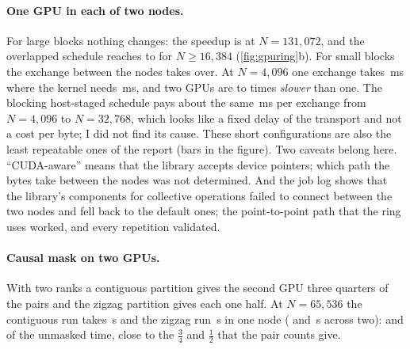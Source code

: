 \paragraph{One GPU in each of two nodes.} For large blocks nothing changes: the
speedup is  at $N=131{,}072$, and the overlapped
schedule reaches  to  for
$N\ge16{,}384$ (\cref{fig:gpuring}b). For small blocks the exchange between the
nodes takes over. At $N=4{,}096$ one exchange takes
\,ms where the kernel needs
\,ms, and two GPUs are
 to  times \emph{slower} than
one. The blocking host-staged schedule pays about the same
\,ms per exchange from $N=4{,}096$ to
$N=32{,}768$, which looks like a fixed delay of the transport and not a cost per
byte; I did not find its cause. These short configurations are also the least
repeatable ones of the report (bars in the figure). Two caveats belong here.
``CUDA-aware'' means that the library accepts device pointers; which path the
bytes take between the nodes was not determined. And the job log shows that the
library's components for collective operations failed to connect between the two
nodes and fell back to the default ones; the point-to-point path that the ring
uses worked, and every repetition validated.

\paragraph{Causal mask on two GPUs.} With two ranks a contiguous partition gives
the second GPU three quarters of the pairs and the zigzag partition gives each
one half. At $N=65{,}536$ the contiguous run takes
\,s and the zigzag run
\,s in one node ( and
\,s across two):  and
 of the unmasked time, close to the
$\tfrac34$ and $\tfrac12$ that the pair counts give.

